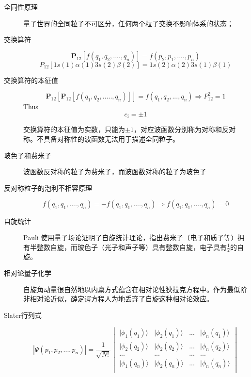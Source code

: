 \documentclass{article}
\numberwithin{equation}{section}
\newcommand{\ket}[1]{| #1 \rangle}
\begin{document}
\begin{description}
	\item[全同性原理] 量子世界的全同粒子不可区分，任何两个粒子交换不影响体系的状态；

	\item[交换算符]
	\begin{equation}
	\textbf{P}_{12}[f(q_1,q_2,....,q_n)]=f(p_2,p_1,....,p_n)
	\end{equation}
	\begin{equation}
	P_{12}[1s(1)\alpha(1)3s(2)\beta(2)]=1s(2)\alpha(2)3s(1)\beta(1)
	\end{equation}

	\item[交换算符的本征值]
	\begin{equation}
	\textbf{P}_{12}[\textbf{P}_{12}[f(q_1,q_2,.....,q_n)]]=f(q_1,q_2,...,q_n)\Rightarrow P_{12}^2=1
	\end{equation}
	Thus
	\begin{equation}
	c_i=\pm 1
	\end{equation}

	交换算符的本征值为实数，只能为$\pm 1$，对应波函数分别称为对称和反对称。不具备对称性的波函数无法用于描述全同粒子。

	\item[玻色子和费米子] 波函数反对称的粒子为费米子，而波函数对称的粒子为玻色子

	\item[反对称粒子的泡利不相容原理]
	\begin{equation}
	f(q_1,q_1,....,q_n)=-f(q_1,q_1,....,q_n) \Rightarrow f(q_1,q_1,....,q_n)=0
	\end{equation}
	\item[自旋统计] Pauli 使用量子场论证明了自旋统计理论，指出费米子（电子和质子等）拥有半整数自旋，而玻色子（光子和声子等）具有整数自旋，电子具有$\frac{1}{2}$的自旋。

	\item[相对论量子化学] 自旋角动量很自然地以内禀方式蕴含在相对论性狄拉克方程中。作为最低阶非相对论近似，薛定谔方程人为地丢弃了自旋这种相对论效应。

	\item[Slater行列式]
	\begin{equation}
	|\Psi(p_1,p_2,...,p_n)|=\frac{1}{\sqrt{N!}}
	\begin{vmatrix}
	\ket{\phi_1(q_1)} & \ket{\phi_2(q_1)} & ... & \ket{\phi_n(q_1)}\\
	\ket{\phi_2(q_2)} & \ket{\phi_2(q_2)} & ... & \ket{\phi_n(q_2)}\\
	... & ...& ... & ...\\
	\ket{\phi_1(q_n)} & \ket{\phi_2(q_n)} & ... & \ket{\phi_n(q_n)}\\
	\end{vmatrix}
	\end{equation}


\end{description}
\end{document}
